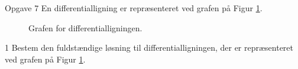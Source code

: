 \begin{opgavetekst}{Opgave 7}
	En differentialligning er repræsenteret ved grafen på Figur \ref{fig:yymaerke2}.
	\begin{figure}[H]
		\centering
		\caption{Grafen for differentialligningen.}
		\label{fig:yymaerke2}
	\end{figure}
	\phantom{h}
\end{opgavetekst}
\begin{delopgave}{1}
	Bestem den fuldstændige løsning til differentialligningen, der er repræsenteret ved grafen på Figur \ref{fig:yymaerke2}.
\end{delopgave}
%
%
%
%
